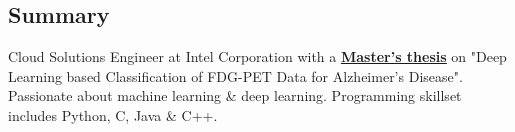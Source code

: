 \documentclass[hidelinks,letterpaper]{deedy-resume-openfont} %
\begin{document}

\lastupdated %


\sectionsep
\subsection{Summary}
Cloud Solutions Engineer at Intel Corporation with a  \href{https://repository.asu.edu/attachments/186430/content/Singh_asu_0010N_16846.pdf}{\bf\underline{Master's thesis}} on "Deep Learning based Classification of FDG-PET Data for Alzheimer's Disease". Passionate about machine learning \& deep learning. Programming skillset includes Python, C, Java \& C++.
\end{document}
